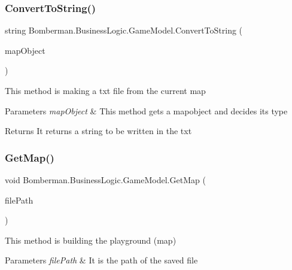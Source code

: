 \subsubsection{\texorpdfstring{ConvertToString()}{ConvertToString()}}
{\footnotesize\ttfamily string Bomberman.\+Business\+Logic.\+Game\+Model.\+Convert\+To\+String (\begin{DoxyParamCaption}\item[{\mbox{\hyperlink{class_bomberman_1_1_model_1_1_map_object}{Map\+Object}}}]{map\+Object }\end{DoxyParamCaption})\hspace{0.3cm}{\ttfamily [inline]}}



This method is making a txt file from the current map 


\begin{DoxyParams}{Parameters}
{\em map\+Object} & This method gets a mapobject and decides its type\\
\hline
\end{DoxyParams}
\begin{DoxyReturn}{Returns}
It returns a string to be written in the txt
\end{DoxyReturn}
\mbox{\label{class_bomberman_1_1_business_logic_1_1_game_model_acadffe349bcbe6f81eca43d7f57b2763}} 
\subsubsection{\texorpdfstring{GetMap()}{GetMap()}}
{\footnotesize\ttfamily void Bomberman.\+Business\+Logic.\+Game\+Model.\+Get\+Map (\begin{DoxyParamCaption}\item[{string}]{file\+Path }\end{DoxyParamCaption})\hspace{0.3cm}{\ttfamily [inline]}}



This method is building the playground (map) 


\begin{DoxyParams}{Parameters}
{\em file\+Path} & It is the path of the saved file\\
\hline
\end{DoxyParams}


